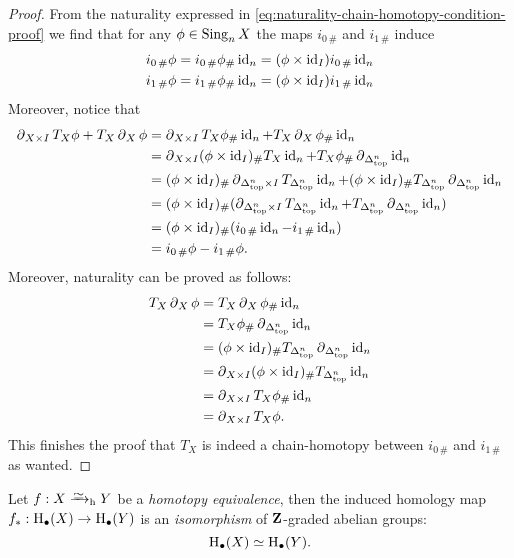 \begin{proof}
From the naturality expressed in
\cref{eq:naturality-chain-homotopy-condition-proof} we find that for any \(\phi
\in \operatorname{Sing}_n X\) the maps \(i_{0\, \#}\) and \(i_{1\, \#}\) induce
\begin{align*}
  i_{0\, \#} \phi
  &= i_{0\, \#} \phi_{\#} \operatorname{id}_n
    = (\phi \times \operatorname{id}_I) i_{0\, \#} \operatorname{id}_n \\
  i_{1\, \#} \phi
  &= i_{1\, \#} \phi_{\#} \operatorname{id}_n
    = (\phi \times \operatorname{id}_I) i_{1\, \#} \operatorname{id}_n \\
\end{align*}
Moreover, notice that
\begin{align*}
  \operatorname{\partial}_{X \times I} T_X \phi + T_X \operatorname{\partial}_X \phi
  &= \operatorname{\partial}_{X \times I} T_X \phi_{\#} \operatorname{id}_n
     + T_X \operatorname{\partial}_X \phi_{\#} \operatorname{id}_n \\
  &= \operatorname{\partial}_{X \times I} (\phi \times \operatorname{id}_I)_{\#} T_X \operatorname{id}_n
    + T_X \phi_{\#} \operatorname{\partial}_{\Delta_{\text{top}}^n} \operatorname{id}_n \\
  &= (\phi \times \operatorname{id}_I)_{\#} \operatorname{\partial}_{\Delta_{\text{top}}^n \times I} T_{\Delta_{\text{top}}^n} \operatorname{id}_n
    + (\phi \times \operatorname{id}_I)_{\#} T_{\Delta_{\text{top}}^n} \operatorname{\partial}_{\Delta_{\text{top}}^n} \operatorname{id}_n \\
  &= (\phi \times \operatorname{id}_I)_{\#} (\operatorname{\partial}_{\Delta_{\text{top}}^n \times I} T_{\Delta_{\text{top}}^n} \operatorname{id}_n
    + T_{\Delta_{\text{top}}^n} \operatorname{\partial}_{\Delta_{\text{top}}^n} \operatorname{id}_n) \\
  &= (\phi \times \operatorname{id}_I)_{\#} (i_{0\, \#} \operatorname{id}_n - i_{1\, \#} \operatorname{id}_n) \\
  &= i_{0\, \#} \phi - i_{1\, \#} \phi.
\end{align*}
Moreover, naturality can be proved as follows:
\begin{align*}
  T_X \operatorname{\partial}_X \phi
  &= T_X \operatorname{\partial}_X \phi_{\#} \operatorname{id}_n \\
  &= T_X \phi_{\#} \operatorname{\partial}_{\Delta_{\text{top}}^n} \operatorname{id}_n \\
  &= (\phi \times \operatorname{id}_I)_{\#} T_{\Delta_{\text{top}}^n} \operatorname{\partial}_{\Delta_{\text{top}}^n} \operatorname{id}_n \\
  &= \operatorname{\partial}_{X \times I} (\phi \times \operatorname{id}_I)_{\#} T_{\Delta_{\text{top}}^n} \operatorname{id}_n \\
  &= \operatorname{\partial}_{X \times I} T_X \phi_{\#} \operatorname{id}_n \\
  &= \operatorname{\partial}_{X \times I} T_X \phi.
\end{align*}
This finishes the proof that \(T_X\) is indeed a chain-homotopy between
\(i_{0\, \#}\) and \(i_{1\, \#}\) as wanted.
\end{proof}

\begin{corollary}
\label{cor:htpy-equiv-iso-homology}
Let \(f: X \isotoht Y\) be a \emph{homotopy equivalence}, then the induced
homology map \(f_{*}: \operatorname{H}_{\bullet}(X) \to \operatorname{H}_{\bullet}(Y)\) is an
\emph{isomorphism} of \(\mathbf{Z}\)-graded abelian groups:
\[
\operatorname{H}_{\bullet}(X) \simeq \operatorname{H}_{\bullet}(Y).
\]
\end{corollary}


